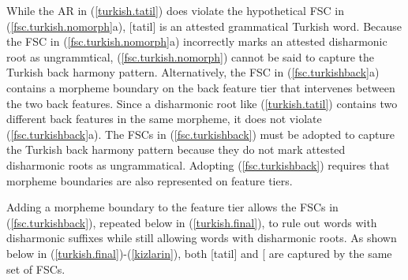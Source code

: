 \documentclass[,doc,floatsintext]{apa6}
\theoremstyle{definition}
\theoremstyle{definition}
\theoremstyle{definition}
\theoremstyle{remark}
\begin{document}
\noindent While the AR in (\ref{turkish.tatil}) does violate the
hypothetical FSC in (\ref{fsc.turkish.nomorph}a), {[}tatil{]} is an
attested grammatical Turkish word. Because the FSC in
(\ref{fsc.turkish.nomorph}a) incorrectly marks an attested disharmonic
root as ungrammtical, (\ref{fsc.turkish.nomorph}) cannot be said to
capture the Turkish back harmony pattern. Alternatively, the FSC in
(\ref{fsc.turkishback}a) contains a morpheme boundary on the back
feature tier that intervenes between the two back features. Since a
disharmonic root like (\ref{turkish.tatil}) contains two different back
features in the same morpheme, it does not violate
(\ref{fsc.turkishback}a). The FSCs in (\ref{fsc.turkishback}) must be
adopted to capture the Turkish back harmony pattern because they do not
mark attested disharmonic roots as ungrammatical. Adopting
(\ref{fsc.turkishback}) requires that morpheme boundaries are also
represented on feature tiers.

Adding a morpheme boundary to the feature tier allows the FSCs in
(\ref{fsc.turkishback}), repeated below in (\ref{turkish.final}), to
rule out words with disharmonic suffixes while still allowing words with
disharmonic roots. As shown below in
(\ref{turkish.final})-(\ref{kizlarin}), both {[}tatil{]} and
{[}\textipa{\LARGE+}\textipa{1n}{]} are
captured by the same set of FSCs.
\end{document}
